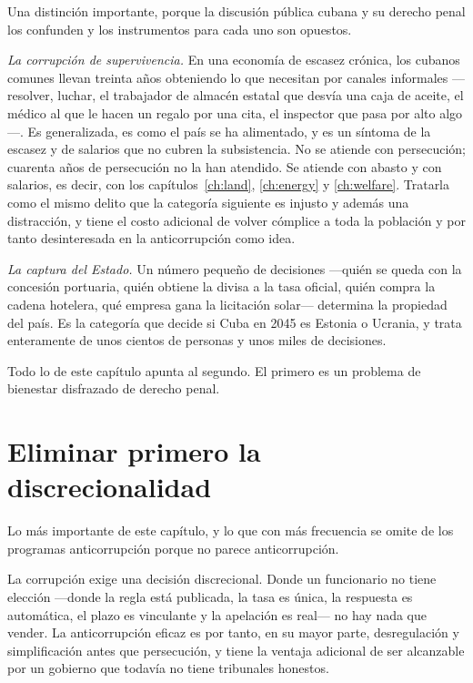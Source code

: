 Una distinción importante, porque la discusión pública cubana y su derecho penal los confunden y
los instrumentos para cada uno son opuestos.

\emph{La corrupción de supervivencia.} En una economía de escasez crónica, los cubanos comunes
llevan treinta años obteniendo lo que necesitan por canales informales ---resolver, luchar, el
trabajador de almacén estatal que desvía una caja de aceite, el médico al que le hacen un regalo
por una cita, el inspector que pasa por alto algo---. Es generalizada, es como el país se ha
alimentado, y es un síntoma de la escasez y de salarios que no cubren la subsistencia. No se
atiende con persecución; cuarenta años de persecución no la han atendido. Se atiende con abasto y
con salarios, es decir, con los capítulos~\ref{ch:land}, \ref{ch:energy} y \ref{ch:welfare}.
Tratarla como el mismo delito que la categoría siguiente es injusto y además una distracción, y
tiene el costo adicional de volver cómplice a toda la población y por tanto desinteresada en la
anticorrupción como idea.

\emph{La captura del Estado.} Un número pequeño de decisiones \citep{hellman1998} ---quién se
queda con la concesión portuaria, quién obtiene la divisa a la tasa oficial, quién compra la
cadena hotelera, qué empresa gana la licitación solar--- determina la propiedad del país. Es la
categoría que decide si Cuba en 2045 es Estonia o Ucrania, y trata enteramente de unos cientos de
personas y unos miles de decisiones.

Todo lo de este capítulo apunta al segundo. El primero es un problema de bienestar disfrazado de
derecho penal.

\section{Eliminar primero la discrecionalidad}

Lo más importante de este capítulo, y lo que con más frecuencia se omite de los programas
anticorrupción porque no parece anticorrupción.

La corrupción exige una decisión discrecional. Donde un funcionario no tiene elección ---donde la
regla está publicada, la tasa es única, la respuesta es automática, el plazo es vinculante y la
apelación es real--- no hay nada que vender. La anticorrupción eficaz es por tanto, en su mayor
parte, desregulación y simplificación antes que persecución, y tiene la ventaja adicional de ser
alcanzable por un gobierno que todavía no tiene tribunales honestos.

